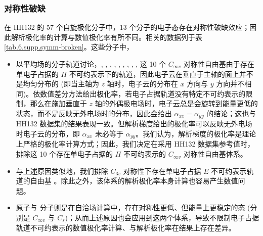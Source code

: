 \subsubsection{对称性破缺}

在 HH132 的 57 个自旋极化分子中，13 个分子的电子态存在对称性破缺效应；因此解析极化率的计算与数值极化率有所不同。相关的数据列于表 \ref{tab.6.supp.symm-broken}。这些分子中，
\begin{itemize}[nosep]
    \item 以平均场的分子轨道讨论，, , , , , , , , ,  这 10 个 $C_{\infty v}$ 对称性自由基由于存在单电子占据的 $\Pi$ 不可约表示下的轨道，因此电子云在垂直于主轴的面上并不是均匀分布的 (即当主轴为 $z$ 轴时，电子云的分布在 $x$ 方向与 $y$ 方向并不相同)。依数值差分方法给出极化率，若电子占据轨道没有特定不可约表示的限制，那么在施加垂直于 $z$ 轴的外偶极电场时，电子云总是会旋转到能量更低的状态，而不是反映无外电场时的分布，因此会给出 $\alpha_{xx} = \alpha_{yy}$ 的结论；这也与 HH132 数据集的结果表现一致。但解析梯度给出的极化率可以反映无外电场时电子云的分布，即 $\alpha_{xx}$ 未必等于 $\alpha_{yy}$。我们认为，解析梯度的极化率是理论上严格的极化率计算方式；因此，我们决定在采用 HH132 数据集参考值时，排除这 10 个存在单电子占据的  $\Pi$ 不可约表示的 $C_{\infty v}$ 对称性自由基体系。
    \item 与上述原因类似地，我们排除 $C_{3v}$ 对称性下存在单电子占据 $E$ 不可约表示轨道的自由基 。除此之外，该体系的解析极化率本身计算也容易产生数值问题。
    \item {} 原子与  分子则是在自洽场计算中，存在对称性更低、但能量上更稳定的态 (分别是 $C_{\infty v}$ 与 $C_s$)；从而上述原因也会应用到这两个体系，导致不限制电子占据轨道不可约表示的数值极化率计算、与解析极化率在结果上存在差异。
\end{itemize}

